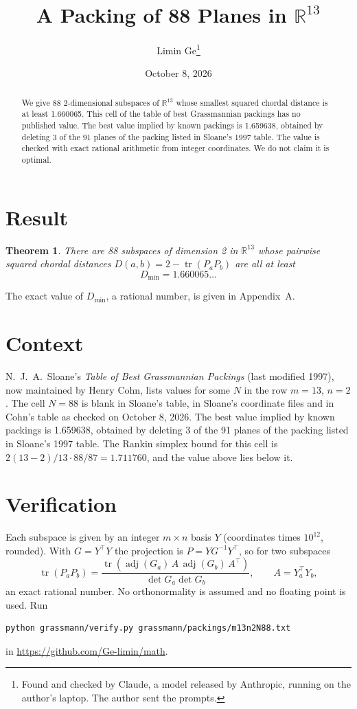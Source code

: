 \documentclass[11pt,a4paper]{article}
\title{A Packing of 88 Planes in $\mathbb{R}^{13}$}
\author{Limin Ge\thanks{Found and checked by Claude, a model released by Anthropic, running on the author's laptop. The author sent the prompts.}}
\date{October 8, 2026}
\newtheorem*{theorem}{Theorem}
\begin{document}
\maketitle
\begin{abstract}
We give 88 2-dimensional subspaces of $\mathbb{R}^{13}$ whose smallest squared chordal distance is at least 1.660065. This cell of the table of best Grassmannian packings has no published value. The best value implied by known packings is 1.659638, obtained by deleting 3 of the 91 planes of the packing listed in Sloane's 1997 table. The value is checked with exact rational arithmetic from integer coordinates. We do not claim it is optimal.
\end{abstract}

\section{Result}
\begin{theorem}
There are 88 subspaces of dimension 2 in $\mathbb{R}^{13}$ whose pairwise squared chordal distances $D(a,b) = 2 - \operatorname{tr}(P_aP_b)$ are all at least
\[ D_{\min} = 1.660065\ldots \]
\end{theorem}
The exact value of $D_{\min}$, a rational number, is given in Appendix~A.


\section{Context}
N.~J.~A.~Sloane's \emph{Table of Best Grassmannian Packings} (last modified 1997), now maintained by Henry Cohn, lists values for some $N$ in the row $m=13$, $n=2$. The cell $N=88$ is blank in Sloane's table, in Sloane's coordinate files and in Cohn's table as checked on October 8, 2026. The best value implied by known packings is 1.659638, obtained by deleting 3 of the 91 planes of the packing listed in Sloane's 1997 table. The Rankin simplex bound for this cell is $2(13-2)/13\cdot 88/87 = 1.711760$, and the value above lies below it.


\section{Verification}
Each subspace is given by an integer $m\times n$ basis $Y$ (coordinates times $10^{12}$, rounded). With $G=Y^\top Y$ the projection is $P=YG^{-1}Y^\top$, so for two subspaces
\[ \operatorname{tr}(P_aP_b)=\frac{\operatorname{tr}(\operatorname{adj}(G_a)\,A\,\operatorname{adj}(G_b)\,A^\top)}{\det G_a\det G_b},\qquad A=Y_a^\top Y_b, \]
an exact rational number. No orthonormality is assumed and no floating point is used. Run
\begin{verbatim}
python grassmann/verify.py grassmann/packings/m13n2N88.txt
\end{verbatim}
in \url{https://github.com/Ge-limin/math}.
\end{document}
